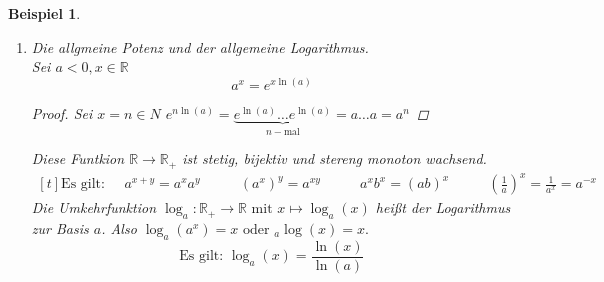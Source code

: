 \documentclass[a4paper,titlepage,oneside]{article}
\def\R{\ensuremath{\mathbb{R}} }
\def\e{\ensuremath{\mathit{e}} }
\theoremstyle{thmstyle}
\newtheorem{bsp}[satz]{Beispiel}
\theoremstyle{subthmstyle}
\begin{document}
\begin{bsp}
\begin{enumerate}
\begin{proof}
\begin{figure}[ht]
\caption{die Exponentialfunktion}
\end{figure}
	Es gibt daher eine stetige Umkehrfunktion $ \ln : \R_+ \to  \R \text{ mit } x \mapsto \ln(x)$ der natürliche Logarithmus.
	$\ln$ ist wieder stetig und streng monoton wachsend.
\end{proof}
\[\text{Es gilt: } \ln(x y) = \ln(x) + \ln(y)\]
	\begin{proof}Sei \begin{math} \ln(x) = \xi\text{ und } \ln(y) = \eta \text{ d.h. } \e^{\xi} = x \text{ und } \e^{\eta} = y\\
	\begin{aligned}[t]\e^{\xi + \eta} &= \e^{\xi} \e^{\eta} = x y &&\text{wende $\ln$ an } \Rightarrow\\
	\ln(\e^{\xi + \eta}) &= \ln(xy) &&\text{da $\ln$ die Umkehrfunktion von $\e$ ist } \Rightarrow\\
	\xi + \eta &= \ln(xy) &&\text{aus Definition } \Rightarrow\\
	\ln(x) + \ln(y) &= \ln(xy)
	\end{aligned} \end{math}\\
	\end{proof}
\item Die allgmeine Potenz und der allgemeine Logarithmus.\\
Sei $ a < 0, x \in \R$ \[a^x = e^{x \ln(a)}\]
\begin{proof}
Sei $x = n \in N$
$e^{n \ln(a)} = \underbrace{e^{\ln(a)} \dots e^{\ln(a)}}_{n-\text{mal}} = a\dots a = a ^n$
\end{proof}
Diese Funtkion $\R \to \R_+$ ist stetig, bijektiv und stereng monoton wachsend.\\
$ \displaystyle \begin{aligned}[t]\text{Es gilt:} &\qquad a^{x+y} = a^x a^y &\qquad (a^x)^y = a^{xy} &\qquad a^x b^x = (ab)^x &\qquad (\frac{1}{a})^x = \frac{1}{a^x} = a^{-x}\end{aligned}$
Die Umkehrfunktion $\log_a : \R_+ \to \R \text{ mit } x \mapsto \log_a(x)$ heißt der Logarithmus zur Basis $a$. Also $ \displaystyle \log_a(a^x) = x \text{ oder } _a\log(x) = x.$
\[\text{Es gilt: } \log_a(x) = \frac{\ln(x)}{\ln(a)}\]
\end{enumerate}
\end{bsp}
\end{document}
